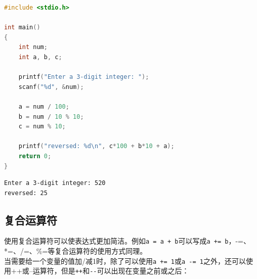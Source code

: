 
\begin{lstlisting}[language=C]
#include <stdio.h>

int main()
{
	int num;
	int a, b, c;

	printf("Enter a 3-digit integer: ");
	scanf("%d", &num);

	a = num / 100;
	b = num / 10 % 10;
	c = num % 10;

	printf("reversed: %d\n", c*100 + b*10 + a);
	return 0;
}
\end{lstlisting}

\begin{tcolorbox}
	\begin{verbatim}
Enter a 3-digit integer: 520
reversed: 25
	\end{verbatim}
\end{tcolorbox}

\vspace{0.5cm}

\subsection{复合运算符}

使用复合运算符可以使表达式更加简洁。例如\lstinline|a = a + b|可以写成\lstinline|a += b|，-=、*=、/=、\%=等复合运算符的使用方式同理。\\

当需要给一个变量的值加/减1时，除了可以使用\lstinline|a += 1|或\lstinline|a -= 1|之外，还可以使用++或--运算符，但是\lstinline|++|和\lstinline|--|可以出现在变量之前或之后：\\

\begin{table}[H]
	\centering
	\caption{自增/自减运算符}
\end{table}


